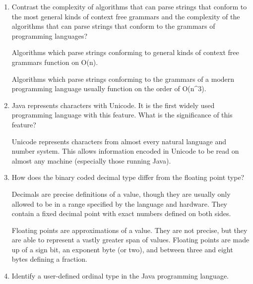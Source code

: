 \begin{enumerate}
  \item Contrast the complexity of algorithms that can parse strings
    that conform to the most general kinds of context free grammars
    and the complexity of the algorithms that can parse strings that
    conform to the grammars of programming languages?

  \begin{answer}

    Algorithms which parse strings conforming to general kinds of context free grammars function on O(n).

    Algorithms which parse strings conforming to the grammars of a modern programming language usually function on the order of O(n^3).

    \end{answer}

  \item Java represents characters with Unicode. It is the first
    widely used programming language with this feature. What is the
    significance of this feature?

  \begin{answer}

    Unicode represents characters from almost every natural language and number system. This allows information encoded in Unicode to be read on almost any machine (especially those running Java).

    \end{answer}

  \item How does the binary coded decimal type differ from the
    floating point type?

  \begin{answer}

    Decimals are precise definitions of a value, though they are usually only allowed to be in a range specified by the language and hardware. They contain a fixed decimal point with exact numbers defined on both sides.

    Floating points are approximations of a value. They are not precise, but they are able to represent a vastly greater span of values. Floating points are made up of a sign bit, an exponent byte (or two), and between three and eight bytes defining a fraction.

    \end{answer}

  \item Identify a user-defined ordinal type in the Java programming
    language.


\end{enumerate}
